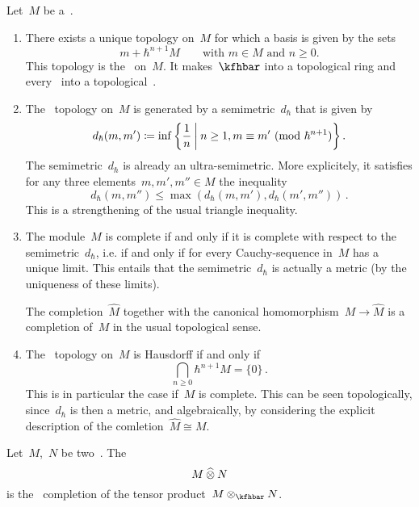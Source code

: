 \documentclass[a4paper, 11pt, oneside]{scrartcl}
\begin{document}
\begin{remark}
  Let~$M$ be a~\module{$\kfhbar$}.
  \begin{enumerate}
    \item
      There exists a unique topology on~$M$ for which a basis is given by the sets
      \[
        m + \hbar^{n+1} M
        \qquad
        \text{with~$m \in M$ and~$n \geq 0$.}
      \]
      This topology is the~ on~$M$.
      It makes~$\kfhbar$ into a topological ring and every~\module{$\kfhbar$} into a topological~\module{$\kfhbar$}.
    \item
      The~\adic{$\hbar$} topology on~$M$ is generated by a semimetric~$d_{\hbar}$ that is given by
      \[
        d_{\hbar}(m, m')
        \defined
        \inf
        {}
        \biggl\{
          \frac{1}{n}
        \suchthat[\bigg]
          n \geq 1,
          m \equiv m' \pMod{\hbar^{n+1}}
        \biggr\} \,.
      \]
      The semimetric~$d_{\hbar}$ is already an ultra-semimetric.
      More explicitely, it satisfies for any three elements~$m, m', m'' \in M$ the inequality
      \[
        d_{\hbar}(m, m'')
        \leq
        \max( d_{\hbar}(m, m'), d_{\hbar}(m', m'') ) \,.
      \]
      This is a strengthening of the usual triangle inequality.
    \item 
      The module~$M$ is complete if and only if it is complete with respect to the semimetric~$d_{\hbar}$, i.e. if and only if for every Cauchy-sequence in~$M$ has a unique limit.
      This entails that the semimetric~$d_{\hbar}$ is actually a metric (by the uniqueness of these limits).

      The completion~$\widehat{M}$ together with the canonical homomorphism~$M \to \widehat{M}$ is a completion of~$M$ in the usual topological sense.
    \item
      The~\adic{$\hbar$} topology on~$M$ is Hausdorff if and only if
      \[
        \bigcap_{n \geq 0} \hbar^{n+1} M
        =
        \{ 0 \} \,.
      \]
      This is in particular the case if~$M$ is complete.
      This can be seen topologically, since~$d_{\hbar}$ is then a metric, and algebraically, by considering the explicit description of the comletion~$\widehat{M} \cong M$.
  \end{enumerate}
\end{remark}

\begin{definition}
  Let~$M$,~$N$ be two~\modules{$\kfhbar$}.
  The 
  \[
    M \mathbin{\widehat{\otimes}} N
  \]
  is the~\adic{$\hbar$} completion of the tensor product~$M \tensor_{\kfhbar} N$.
\end{definition}
\end{document}
